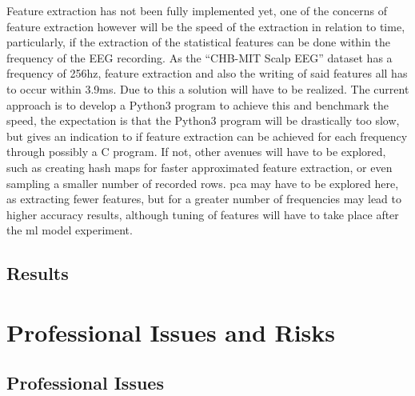 \documentclass[12pt]{article}
\begin{document}
Feature extraction has not been fully implemented yet, one of the concerns of feature extraction however will be the speed of the extraction in relation to time, particularly, if the extraction of the statistical features can be done within the frequency of the EEG recording. As the ``CHB-MIT Scalp EEG'' dataset has a frequency of 256hz, feature extraction and also the writing of said features all has to occur within 3.9ms. Due to this a solution will have to be realized. The current approach is to develop a Python3 program to achieve this and benchmark the speed, the expectation is that the Python3 program will be drastically too slow, but gives an indication to if feature extraction can be achieved for each frequency through possibly a C program. If not, other avenues will have to be explored, such as creating hash maps for faster approximated feature extraction, or even sampling a smaller number of recorded rows. \acrfull{pca} may have to be explored here, as extracting fewer features, but for a greater number of frequencies may lead to higher accuracy results, although tuning of features will have to take place after the \acrshort{ml} model experiment.

\subsection{Results}




\section{Professional Issues and Risks}

\subsection{Professional Issues}
\end{document}
